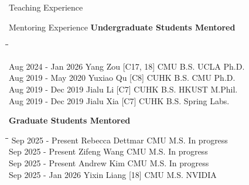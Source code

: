 \begin{rSection}{Teaching Experience}
\newpage
\end{rSection}



\begin{rSection}{Mentoring Experience}
    {\bf Undergraduate Students Mentored} 
    \vspace{-0.6em}
    \begin{tabbing}
        \hspace{1.5in}\= \hspace{1.5in}\= \hspace{1in}\= \kill

        Aug 2024 - Jan 2026 \>  Yang Zou [C17, 18] \> CMU B.S. \> UCLA Ph.D.\\
        Aug 2019 - May 2020 \>  Yuxiao Qu [C8] \> CUHK B.S. \> CMU Ph.D. \\
        Aug 2019 - Dec 2019 \>  Jialu Li [C7] \> CUHK B.S. \> HKUST M.Phil. \\
        Aug 2019 - Dec 2019 \>  Jialu Xia [C7] \> CUHK B.S. \> Spring Labs. 
    \end{tabbing}
    {\bf Graduate Students Mentored} 
    \vspace{-0.6em}
    \begin{tabbing}
        \hspace{1.5in}\= \hspace{1.5in}\= \hspace{1in}\= \kill
        Sep 2025 - Present \>  Rebecca Dettmar \> CMU M.S. \> In progress \\
        Sep 2025 - Present \>  Zifeng Wang \> CMU M.S. \> In progress \\
        Sep 2025 - Present \>  Andrew Kim \> CMU M.S. \> In progress \\
        Sep 2025 - Jan 2026 \>  Yixin Liang [18] \> CMU M.S. \> NVIDIA 
    \end{tabbing}
    \end{rSection}
    
